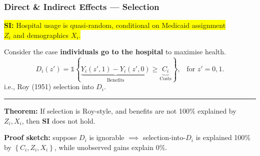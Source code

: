 \documentclass[dvipsnames,handout]{beamer} %
\renewcommand{\vec}[1]{\boldsymbol{\mathit{#1}}}                           %
\newcommand{\indicator}[1]{\mathds{1}\left\{ #1 \right\}}                  %
\begin{document}
\begin{frame}[noframenumbering]
    \frametitle{Direct \& Indirect Effects --- Selection} 
    \colorbox{yellow}{\textbf{SI:}
        Hospital usage is quasi-random, conditional on Medicaid assignment} \\
    \colorbox{yellow}{$Z_i$ and demographics $\vec X_i$.}

    \vskip0.25cm
    Consider the case \textbf{individuals go to the hospital} to maximise health.
    \[ D_i \left( z' \right) = \indicator{
        \underbrace{Y_i\left( z', 1 \right) - Y_i\left( z', 0 \right)}_{\text{Benefits}}
        \geq \underbrace{C_i}_{\text{Costs}}}, \;\;\; \text{for } z'=0,1.
    \]
    i.e., Roy (1951) selection into $D_i$.
    \par\noindent\rule{\textwidth}{0.4pt}
    \vfill
    \textbf{Theorem:}
    If selection is Roy-style, and benefits are not 100\% explained by $Z_i, \vec X_i$, then \textbf{SI} does not hold.

    \vskip0.125cm
    \textbf{Proof sketch:} suppose $D_i$ is ignorable $\implies$ selection-into-$D_i$ is explained 100\% by $\left\{ C_i, Z_i, \vec X_i \right\}$, while unobserved gains explain 0\%.
\end{frame}
\end{document}
